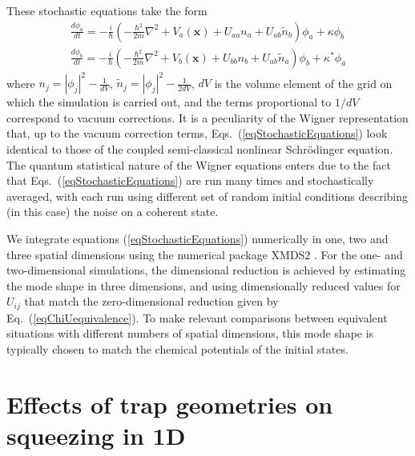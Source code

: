 \documentclass{iopart}
\begin{document}
These stochastic equations take the form
\begin{eqnarray}
\frac{d \phi_a}{dt} = -\frac{i}{\hbar}\left(-\frac{\hbar^2}{2 m}\nabla^2+V_a(\mathbf{x}) + U_{a a} n_a + U_{a b} \tilde{n}_b  \right)\phi_a   + \kappa \phi_b  \nonumber \\
\frac{d \phi_b}{dt} = -\frac{i}{\hbar}\left(-\frac{\hbar^2}{2 m}\nabla^2+V_b(\mathbf{x}) + U_{b b} n_b + U_{a b} \tilde{n}_a   \right)\phi_b   + \kappa^* \phi_a
  \label{eqStochasticEquations}
\end{eqnarray}
where $n_j=\left|\phi_{j}\right|^2 -\frac{1}{dV}$, $\tilde{n}_j=\left|\phi_{j}\right|^2 -\frac{1}{2 dV}$, $dV$ is the volume element of the grid on which the simulation is carried out, and the terms proportional to $1/dV$ correspond to vacuum corrections. It is a peculiarity of the Wigner representation that, up to the vacuum correction terms, Eqs.~(\ref{eqStochasticEquations}) look identical to those of the coupled semi-classical nonlinear Schr{\"{o}}dinger equation. The quantum statistical nature of the Wigner equations enters due to the fact that Eqs.~(\ref{eqStochasticEquations}) are run many times and stochastically averaged, with each run using different set of random initial conditions describing (in this case) the noise on a coherent state.

We integrate equations (\ref{eqStochasticEquations}) numerically in one, two and three spatial dimensions using the numerical package XMDS2 \cite{dennis2013}.  For the one- and two-dimensional simulations, the dimensional reduction is achieved by estimating the mode shape in three dimensions, and using dimensionally reduced values for $U_{ij}$ that match the zero-dimensional reduction given by Eq.~(\ref{eqChiUequivalence}).  To make relevant comparisons between equivalent situations with different numbers of spatial dimensions, this mode shape is typically chosen to match the chemical potentials of the initial states.  

\section{Effects of trap geometries on squeezing in 1D} \label{sec:1Dsim}
\end{document}
